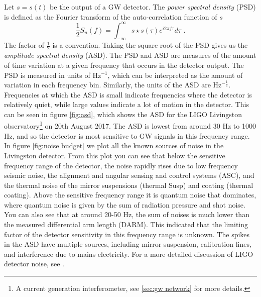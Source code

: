 \documentclass[11pt]{cuthesis}
\newcommand{\fs}{\text{ .}}
\newcommand{\infint}{\int^\infty_{-\infty} }
\begin{document}
Let $s=s(t)$ be the  output of a GW detector. The \textit{power spectral density} (PSD) is defined as the Fourier transform of the auto-correlation function of $s$
\begin{equation} \label{eqn:PSD}
\frac{1}{2} S_n(f)=\infint s \star s(\tau)e^{i 2\pi f \tau} d\tau \fs
\end{equation}
The factor of $\frac{1}{2}$ is a convention. Taking the square root of the PSD gives us the \textit{amplitude spectral density} (ASD). The PSD and ASD are measures of the amount of time variation at a given frequency that occurs in the detector output. The PSD is measured in units of Hz$^{-1}$, which can be interpreted as the amount of variation in each frequency bin. Similarly, the units of the ASD are Hz$^{-\frac{1}{2}}$. Frequencies at which the ASD is small indicate frequencies where the detector is relatively quiet, while large values indicate a lot of motion in the detector. This can be seen in figure \ref{fig:asd}, which shows the ASD for the LIGO Livingston observatory\footnote{A current generation interferometer, see \ref{sec:gw network} for more details.} on 20th August 2017. The ASD is lowest from around 30 Hz to 1000 Hz, and so the detector is most sensitive to GW signals in this frequency range. In figure \ref{fig:noise budget} we plot all the known sources of noise in the Livingston detector. From this plot you can see that below the sensitive frequency range of the detector, the noise rapidly rises due to low frequency seismic noise, the alignment and angular sensing and control systems (ASC), and the thermal noise of the mirror suspensions (thermal Susp) and coating (thermal coating). Above the sensitive frequency range it is quantum noise that dominates, where quantum noise is given by the sum of radiation pressure and shot noise. You can also see that at around 20-50 Hz, the sum of noises is much lower than the measured differential arm length (DARM). This indicated that the limiting factor of the detector sensitivity in this frequency range is unknown. The spikes in the ASD have multiple sources, including mirror suspension, calibration lines, and interference due to mains electricity. For a more detailed discussion of LIGO detector noise, see \cite{GW150914-detector,noise_budget_martynov}.
\end{document}
